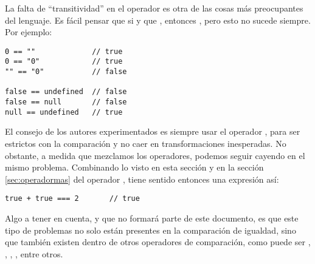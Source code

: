 La falta de "`transitividad"' en el operador \code{==} es otra de las cosas más preocupantes del lenguaje. Es fácil pensar que si  y que , entonces , pero esto no sucede siempre.  Por ejemplo:

\begin{lstlisting}[title={Falta de transitividad en \code{==}}]
0 == ""             // true
0 == "0"            // true
"" == "0"           // false

false == undefined  // false
false == null       // false
null == undefined   // true
\end{lstlisting}

El consejo de los autores experimentados es siempre usar el operador \code{===}, para ser estrictos con la comparación y no caer en transformaciones inesperadas. No obstante, a medida que mezclamos los operadores, podemos seguir cayendo en el mismo problema. Combinando lo visto en esta sección y en la sección \ref{sec:operadormas} del operador \code{+}, tiene sentido entonces una expresión así:

\begin{lstlisting}
true + true === 2		// true
\end{lstlisting}

Algo a tener en cuenta, y que no formará parte de este documento, es que este tipo de problemas no solo están presentes en la comparación de igualdad, sino que también existen dentro de otros operadores de comparación, como puede ser \code{>}, \code{>=}, \code{<}, \code{<=}, entre otros.
